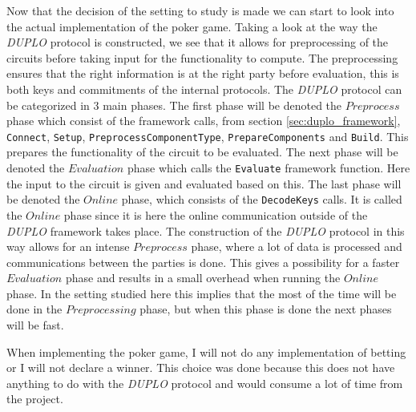 \documentclass[twoside,11pt,openright]{report}
\newcommand{\DUPLO}{\textit{DUPLO} }
\begin{document}
Now that the decision of the setting to study is made we can start to look into the actual implementation of the poker game. Taking a look at the way the \DUPLO protocol is constructed, we see that it allows for preprocessing of the circuits before taking input for the functionality to compute. The preprocessing ensures that the right information is at the right party before evaluation, this is both keys and commitments of the internal protocols. The \DUPLO protocol can be categorized in $3$ main phases. The first phase will be denoted the $Preprocess$ phase which consist of the framework calls, from section \ref{sec:duplo_framework}, \verb|Connect|, \verb|Setup|, \verb|PreprocessComponentType|, \verb|PrepareComponents| and \verb|Build|. This prepares the functionality of the circuit to be evaluated. The next phase will be denoted the $Evaluation$ phase which calls the \verb|Evaluate| framework function. Here the input to the circuit is given and evaluated based on this. The last phase will be denoted the $Online$ phase, which consists of the \verb|DecodeKeys| calls. It is called the $Online$ phase since it is here the online communication outside of the \DUPLO framework takes place. The construction of the \DUPLO protocol in this way allows for an intense $Preprocess$ phase, where a lot of data is processed and communications between the parties is done. This gives a possibility for a faster $Evaluation$ phase and results in a small overhead when running the $Online$ phase. In the setting studied here this implies that the most of the time will be done in the $Preprocessing$ phase, but when this phase is done the next phases will be fast.

When implementing the poker game, I will not do any implementation of betting or I will not declare a winner. This choice was done because this does not have anything to do with the \DUPLO protocol and would consume a lot of time from the project.

\bigskip
\end{document}
